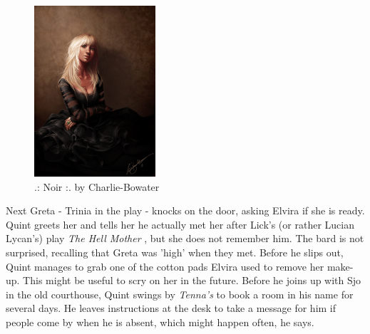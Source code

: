 \begin{figure}[h]
	\centering
	\includegraphics[width=0.4\textwidth]{images/Noir-79828039_mod.jpg}
	\caption{.: Noir :. by Charlie-Bowater}
	\label{fig:Noir-79828039}
\end{figure}

Next Greta - Trinia in the play - knocks on the door, asking Elvira if she is ready. Quint greets her and tells her he actually met her after Lick's (or rather Lucian Lycan's) play {\itshape The Hell Mother} , but she does not remember him. The bard is not surprised, recalling that Greta was 'high' when they met. Before he slips out, Quint manages to grab one of the cotton pads Elvira used to remove her make-up. This might be useful to scry on her in the future. Before he joins up with Sjo in the old courthouse, Quint swings by {\itshape Tenna's} to book a room in his name for several days. He leaves instructions at the desk to take a message for him if people come by when he is absent, which might happen often, he says. 